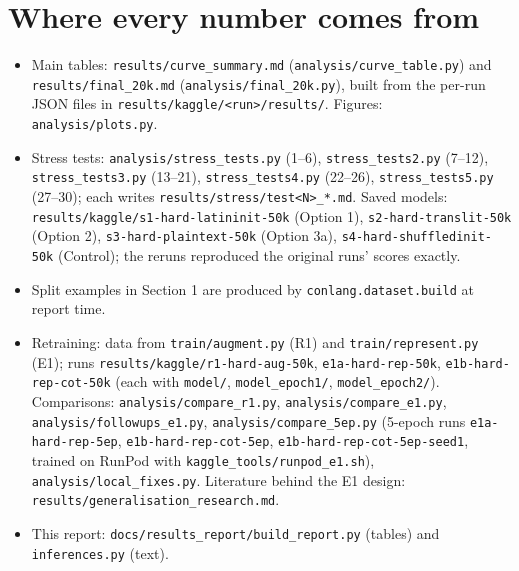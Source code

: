 \documentclass[10pt,a4paper,oneside]{article}
\begin{document}
\appendix\section{Where every number comes from}
{\sloppy\raggedright

\begin{itemize}
\item Main tables: \texttt{results/curve\_summary.md} (\texttt{analysis/curve\_table.py}) and
\texttt{results/final\_20k.md} (\texttt{analysis/final\_20k.py}), built from the per-run JSON files in
\texttt{results/kaggle/<run>/results/}. Figures: \texttt{analysis/plots.py}.
\item Stress tests: \texttt{analysis/stress\_tests.py} (1--6), \texttt{stress\_tests2.py} (7--12),
\texttt{stress\_tests3.py} (13--21), \texttt{stress\_tests4.py} (22--26), \texttt{stress\_tests5.py} (27--30); each
writes \texttt{results/stress/test<N>\_*.md}. Saved models: \texttt{results/kaggle/s1-hard-latininit-50k} (Option 1),
\texttt{s2-hard-translit-50k} (Option 2), \texttt{s3-hard-plaintext-50k} (Option 3a),
\texttt{s4-hard-shuffledinit-50k} (Control); the reruns reproduced the original runs' scores exactly.
\item Split examples in Section 1 are produced by \texttt{conlang.dataset.build} at report time.
\item Retraining: data from \texttt{train/augment.py} (R1) and \texttt{train/represent.py} (E1); runs
\texttt{results/kaggle/r1-hard-aug-50k}, \texttt{e1a-hard-rep-50k}, \texttt{e1b-hard-rep-cot-50k} (each with
\texttt{model/}, \texttt{model\_epoch1/}, \texttt{model\_epoch2/}). Comparisons: \texttt{analysis/compare\_r1.py},
\texttt{analysis/compare\_e1.py}, \texttt{analysis/followups\_e1.py}, \texttt{analysis/compare\_5ep.py}
(5-epoch runs \texttt{e1a-hard-rep-5ep}, \texttt{e1b-hard-rep-cot-5ep}, \texttt{e1b-hard-rep-cot-5ep-seed1}, trained
on RunPod with \texttt{kaggle\_tools/runpod\_e1.sh}), \texttt{analysis/local\_fixes.py}. Literature behind the E1 design:
\texttt{results/generalisation\_research.md}.
\item This report: \texttt{docs/results\_report/build\_report.py} (tables) and \texttt{inferences.py} (text).
\end{itemize}
}
\end{document}
